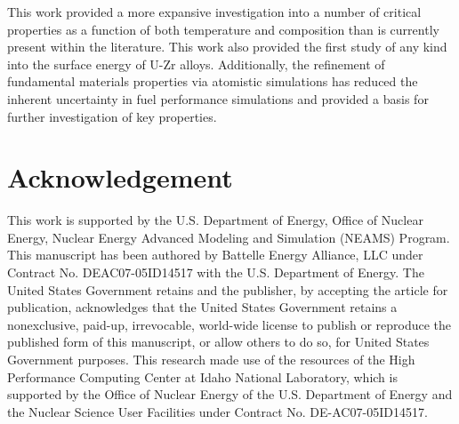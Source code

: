 \documentclass[review]{elsarticle}
\begin{document}
This work provided a more expansive investigation into a number of critical properties as a function of both temperature and composition than is currently present within the literature. This work also provided the first study of any kind into the surface energy of U-Zr alloys. Additionally, the refinement of fundamental materials properties via atomistic simulations has reduced the inherent uncertainty in fuel performance simulations and provided a basis for further investigation of key properties.


\section{Acknowledgement}
This work is supported by the U.S. Department of Energy, Office of Nuclear Energy, Nuclear Energy Advanced Modeling and Simulation (NEAMS) Program. This manuscript has been authored by Battelle Energy Alliance, LLC under Contract No. DEAC07-05ID14517 with the U.S. Department of Energy. The United States Government retains and the publisher, by accepting the article for publication, acknowledges that the United States Government retains a nonexclusive, paid-up, irrevocable, world-wide license to publish or reproduce the published form of this manuscript, or allow others to do so, for United States Government purposes. This research made use of the resources of the High Performance Computing Center at Idaho National Laboratory, which is supported by the Office of Nuclear Energy of the U.S. Department of Energy and the Nuclear Science User Facilities under Contract No. DE-AC07-05ID14517.




\end{document}
